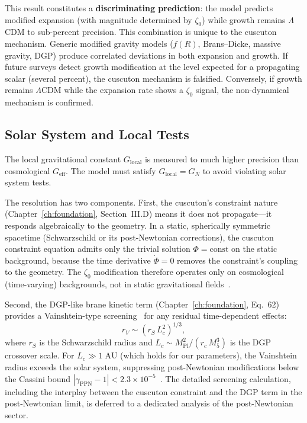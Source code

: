 This result constitutes a \textbf{discriminating prediction}: the model predicts modified expansion (with magnitude determined by $\zeta_0$) while growth remains $\Lambda$CDM to sub-percent precision. This combination is unique to the cuscuton mechanism. Generic modified gravity models ($f(R)$, Brans--Dicke, massive gravity, DGP) produce correlated deviations in both expansion and growth. If future surveys detect growth modification at the level expected for a propagating scalar (several percent), the cuscuton mechanism is falsified. Conversely, if growth remains $\Lambda$CDM while the expansion rate shows a $\zeta_0$ signal, the non-dynamical mechanism is confirmed.

\subsection{Solar System and Local Tests}
\label{sec:2-solar}

The local gravitational constant $G_\mathrm{local}$ is measured to much higher precision than cosmological $G_\mathrm{eff}$. The model must satisfy $G_\mathrm{local} = G_N$ to avoid violating solar system tests.

The resolution has two components. First, the cuscuton's constraint nature (Chapter~\ref{ch:foundation}, Section~III.D) means it does not propagate---it responds algebraically to the geometry. In a static, spherically symmetric spacetime (Schwarzschild or its post-Newtonian corrections), the cuscuton constraint equation admits only the trivial solution $\Phi = \text{const}$ on the static background, because the time derivative $\dot{\Phi} = 0$ removes the constraint's coupling to the geometry. The $\zeta_0$ modification therefore operates only on cosmological (time-varying) backgrounds, not in static gravitational fields~\cite{ch2:Afshordi2007}.

Second, the DGP-like brane kinetic term (Chapter~\ref{ch:foundation}, Eq.~62) provides a Vainshtein-type screening~\cite{ch2:Vainshtein1972} for any residual time-dependent effects:
\begin{equation}
r_V \sim \left(r_S\,L_c^2\right)^{1/3},
\label{eq:2-Vainshtein}
\end{equation}
where $r_S$ is the Schwarzschild radius and $L_c \sim M_\mathrm{Pl}^2/(r_c\,M_5^3)$ is the DGP crossover scale. For $L_c \gg 1\;\mathrm{AU}$ (which holds for our parameters), the Vainshtein radius exceeds the solar system, suppressing post-Newtonian modifications below the Cassini bound $|\gamma_\mathrm{PPN} - 1| < 2.3 \times 10^{-5}$~\cite{ch2:Bertotti2003}. The detailed screening calculation, including the interplay between the cuscuton constraint and the DGP term in the post-Newtonian limit, is deferred to a dedicated analysis of the post-Newtonian sector.

